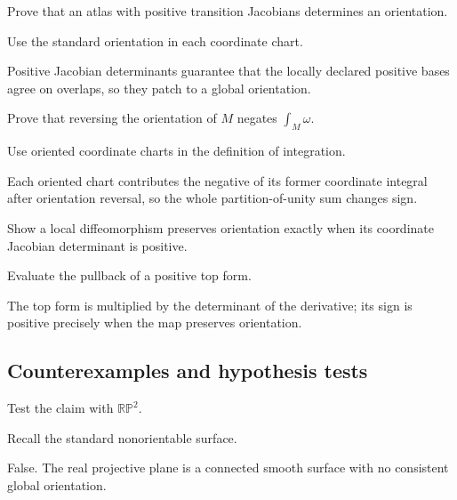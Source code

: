 \begin{exercise}\label{exr:vii10-ped-07}
Prove that an atlas with positive transition Jacobians determines an orientation.
\end{exercise}
\begin{hint}
Use the standard orientation in each coordinate chart.
\end{hint}
\begin{solution}
Positive Jacobian determinants guarantee that the locally declared positive bases agree on overlaps, so they patch to a global orientation.
\end{solution}

\begin{exercise}\label{exr:vii10-ped-08}
Prove that reversing the orientation of \(M\) negates \(\int_M\omega\).
\end{exercise}
\begin{hint}
Use oriented coordinate charts in the definition of integration.
\end{hint}
\begin{solution}
Each oriented chart contributes the negative of its former coordinate integral after orientation reversal, so the whole partition-of-unity sum changes sign.
\end{solution}

\begin{exercise}\label{exr:vii10-ped-09}
Show a local diffeomorphism preserves orientation exactly when its coordinate Jacobian determinant is positive.
\end{exercise}
\begin{hint}
Evaluate the pullback of a positive top form.
\end{hint}
\begin{solution}
The top form is multiplied by the determinant of the derivative; its sign is positive precisely when the map preserves orientation.
\end{solution}

\subsection*{Counterexamples and hypothesis tests}

\begin{exercise}\label{exr:vii10-ped-10}
Test the claim with \(\mathbb{RP}^2\).
\end{exercise}
\begin{hint}
Recall the standard nonorientable surface.
\end{hint}
\begin{solution}
False.  The real projective plane is a connected smooth surface with no consistent global orientation.
\end{solution}

